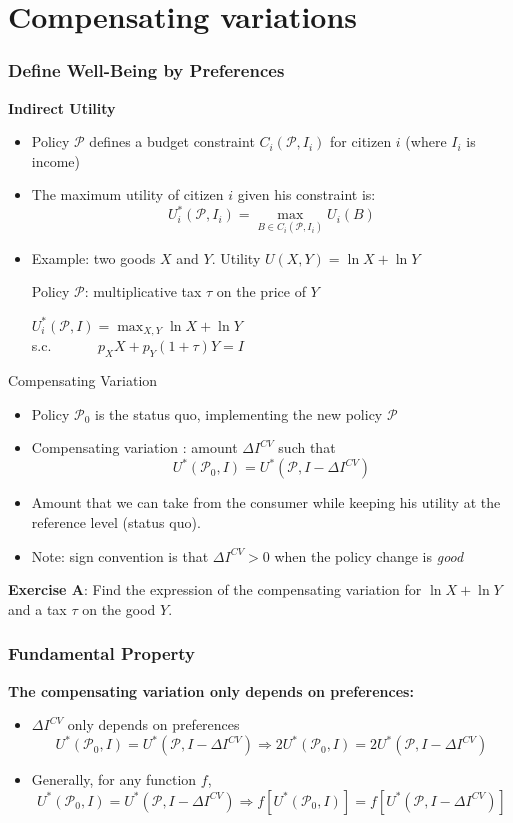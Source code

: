 \documentclass[handout]{beamer}
\newcommand{\mcl}{\mathcal}
\newcommand{\mdp}{\medskip \pause}
\begin{document}
\section{Compensating variations}

\begin{frame} \frametitle{Define Well-Being by Preferences}
\textbf{Indirect Utility} \begin{itemize}
\item
Policy $\mcl P$ defines a budget constraint $C_i(\mcl P,I_i)$ for citizen $i$ (where $I_i$ is income)
\item The maximum utility of citizen $i$ given his constraint is: $$U_i^*(\mcl P,I_i) = \max_{B \in C_i(\mcl P, I_i)} U_i(B)$$
\item Example: two goods $X$ and $Y$. Utility $U(X,Y) = \ln X + \ln Y$ \medskip

Policy $\mcl P$: multiplicative tax $\tau$ on the price of
$Y$\mdp

$U_i^*(\mcl P,I) = \max_{X,Y} \ln X + \ln Y$ \\ s.c. $\quad \quad \quad
p_X  X + p_Y(1 + \tau) Y = I$ \end{itemize}
\end{frame}

\begin{frame}{Compensating Variation}
  \begin{itemize} \item Policy $\mcl P_0$ is the status
quo, implementing the new policy $\mcl P$ \item Compensating variation :  amount $\Delta I^{CV}$  such that $$U^*(\mcl P_0,I) = U^*(\mcl P,
I - \Delta I^{CV})$$    \item    Amount that we can take from the consumer while keeping his utility at the reference level (status quo).  

\item Note: sign convention is that  $\Delta I^{CV}>0$ when the policy change is \textit{good} 

 \end{itemize}
 
 \textbf{Exercise A}: Find the expression of the compensating variation for $\ln X + \ln Y$ and a tax $\tau$ on the good $Y$. 
\end{frame}

\begin{frame} \frametitle{Fundamental Property}

\textbf{The compensating variation only depends on preferences:} \begin{itemize} \item $\Delta I^{CV}$ only depends on preferences $$U^*(\mcl P_0,I) = U^*(\mcl P, I - \Delta I^{CV})
\Rightarrow 2 U^*(\mcl P_0,I) = 2  U^*(\mcl P, I- \Delta I^{CV})$$ \item Generally, for any function $f$, $$U^*(\mcl P_0,I) = U^*(\mcl P, I - \Delta I^{CV})
\Rightarrow f[U^*(\mcl P_0,I)] = f[ U^*(\mcl P, I - \Delta I^{CV})]$$\end{itemize}
 
\end{frame}
 
\end{document}
